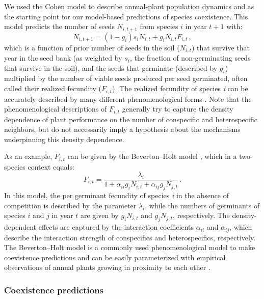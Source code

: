 We used the Cohen model \citep{cohen1966optimizing,watkinson_density-dependence_1980} to describe annual-plant population dynamics and as the starting point for our model-based predictions of species coexistence. This model predicts the number of seeds $N_{i,t+1}$ from species $i$ in year $t+1$ with:
\begin{equation}
\label{annual_plant}
    N_{i,t+1}= (1-g_i)s_{i} N_{i,t}  + g_{i} N_{i,t}F_{i,t}\,,
\end{equation}
which is a function of prior number of seeds in the soil ($N_{i,t}$) that survive that year in the seed bank (as weighted by $s_{i}$, the fraction of non-germinating seeds that survive in the soil), and the seeds that germinate (described by $g_i$) multiplied by the number of viable seeds produced per seed germinated, often called their realized fecundity ($F_{i,t}$). The realized fecundity of species \textit{i} can be accurately described by many different phenomenological forms \citep{law_response-surface_1987, godwin2020empiricist}. Note that the phenomenological descriptions of $F_{i,t}$ generally try to capture the density dependence of plant performance on the number of conspecific and heterospecific neighbors, but do not necessarily imply a hypothesis about the mechanisms underpinning this density dependence.

As an example, $F_{i,t}$ can be given by the Beverton--Holt model \citep{beverton1954notes}, which in a two-species context equals:
 \begin{equation}
 \label{Beverton-Holt}
    F_{i,t} = \frac{\lambda_{i}}{1 + \alpha_{ii}g_{i}N_{i,t} + \alpha_{ij}g_{j}N_{j,t}}\,.
\end{equation}
In this model, the per germinant fecundity of species \textit{i} in the absence of competition is described by the parameter $\lambda_{i}$, while the numbers of germinants of species $i$ and $j$ in year $t$ are given by $g_{i}N_{i,t}$ and $g_{j}N_{j,t}$, respectively. The density-dependent effects are captured by the interaction coefficients $\alpha_{ii}$ and $\alpha_{ij}$, which describe the interaction strength of conspecifics and heterospecifics, respectively. The Beverton--Holt model is a commonly used phenomenological model to make coexistence predictions and can be easily parameterized with empirical observations of annual plants growing in proximity to each other \citep{godoy_phenology_2014, godoy_phylogenetic_2014, levine2009importance}.

\subsubsection*{Coexistence predictions}

